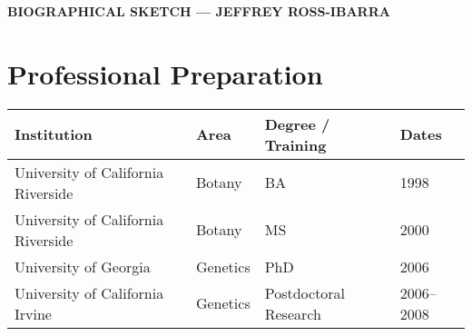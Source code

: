 \documentclass[11pt]{article}
\begin{document}
\begin{center}
	\begin{Large}
		\sf\textbf{\uppercase{Biographical Sketch --- Jeffrey Ross-Ibarra}}
	\end{Large}
\end{center}



\section{Professional Preparation}

\begin{tabular}{l l l l}
Institution    \hspace{52mm}              &   Area  \hspace{10mm}     & Degree / Training  \hspace{13mm}    & Dates \\
\hline
University of California Riverside & Botany & BA & 1998 \\
University of California Riverside & Botany & MS & 2000 \\
University of Georgia & Genetics & PhD & 2006\\
University of California Irvine & Genetics & Postdoctoral Research & 2006--2008 \\
\hline 
\end{tabular}
\end{document}
